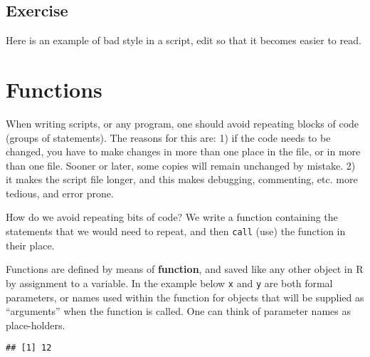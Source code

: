 \documentclass[paper=a4,headsepline,BCOR=12mm,twoside,open=right,%
titlepage,headings=small,fontsize=10pt,index=totoc,bibliography=totoc,%
captions=tableheading,captions=nooneline]{scrbook}\usepackage{knitr}
\begin{document}
\subsection{Exercise}

Here is an example of bad style in a script, edit so that it becomes easier to read.

\begin{knitrout}\footnotesize
{}\color{fgcolor}\begin{kframe}
\begin{alltt}
 \hlkwb{<-}  
 \hlkwb{<-}  
 \hlkwb{<-}
     \hlopt{*}
 \hlkwb{->} 
      \hlstd{(}
\hlstd{)}
\end{alltt}
\end{kframe}
\end{knitrout}

\section{Functions}

When writing scripts, or any program, one should avoid repeating blocks of code (groups of statements). The reasons for this are: 1) if the code needs to be changed, you have to make changes in more than one place in the file, or in more than one file. Sooner or later, some copies will remain unchanged by mistake. 2) it makes the script file longer, and this makes debugging, commenting, etc. more tedious, and error prone.

How do we avoid repeating bits of code? We write a function containing the statements that we would need to repeat, and then \texttt{call} (use) the function in their place.

Functions are defined by means of \textbf{function}, and saved like any other object in R by assignment to a variable. In the example below \texttt{x} and \texttt{y} are both formal parameters, or names used within the function for objects that will be supplied as ``arguments'' when the function is called. One can think of parameter names as place-holders.

\begin{knitrout}\footnotesize
{}\color{fgcolor}\begin{kframe}
\begin{alltt}
 \hlkwb{<-} \hlstd{(}\hlstd{,}  \hlopt{*} 
\hlstd{(}\hlstd{,} \hlstd{)}
\end{alltt}
\begin{verbatim}
## [1] 12
\end{verbatim}
\end{kframe}
\end{knitrout}
\end{document}
